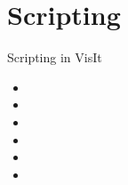 \section{Scripting}
\begin{frame}{Scripting in VisIt}{}
  \begin{itemize}
  \item 
  \item 
  \item 
  \item 
  \item 
  \item 
  \end{itemize}
\end{frame}
